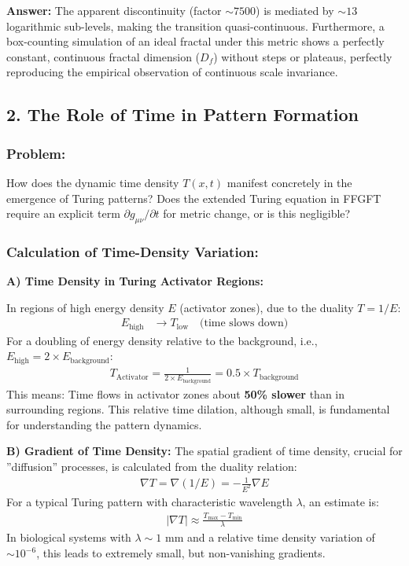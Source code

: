 	\textbf{Answer:} The apparent discontinuity (factor $\sim 7500$) is mediated by $\sim 13$ logarithmic sub-levels, making the transition quasi-continuous. Furthermore, a box-counting simulation of an ideal fractal under this metric shows a perfectly constant, continuous fractal dimension ($D_f$) without steps or plateaus, perfectly reproducing the empirical observation of continuous scale invariance.
	
	\subsection*{2. The Role of Time in Pattern Formation}
	
	\subsubsection*{Problem:}
	How does the dynamic time density $T(x,t)$ manifest concretely in the emergence of Turing patterns? Does the extended Turing equation in FFGFT require an explicit term $\partial g_{\mu\nu}/\partial t$ for metric change, or is this negligible?
	
	\subsubsection*{Calculation of Time-Density Variation:}
	
	\textbf{A) Time Density in Turing Activator Regions:}
	
	In regions of high energy density $E$ (activator zones), due to the duality $T = 1/E$:
	\begin{align*}
		E_{\text{high}} &\rightarrow T_{\text{low}} \quad \text{(time slows down)}
	\end{align*}
	For a doubling of energy density relative to the background, i.e., $E_{\text{high}} = 2 \times E_{\text{background}}$:
	\begin{align*}
		T_{\text{Activator}} = \frac{1}{2 \times E_{\text{background}}} = 0.5 \times T_{\text{background}}
	\end{align*}
	This means: Time flows in activator zones about \textbf{50\% slower} than in surrounding regions. This relative time dilation, although small, is fundamental for understanding the pattern dynamics.
	
	\textbf{B) Gradient of Time Density:}
	The spatial gradient of time density, crucial for ''diffusion'' processes, is calculated from the duality relation:
	\begin{align*}
		\nabla T = \nabla(1/E) = -\frac{1}{E^2} \nabla E
	\end{align*}
	For a typical Turing pattern with characteristic wavelength $\lambda$, an estimate is:
	\begin{align*}
		|\nabla T| \approx \frac{T_{\text{max}} - T_{\text{min}}}{\lambda}
	\end{align*}
	In biological systems with $\lambda \sim 1$ mm and a relative time density variation of $\sim 10^{-6}$, this leads to extremely small, but non-vanishing gradients.
	
